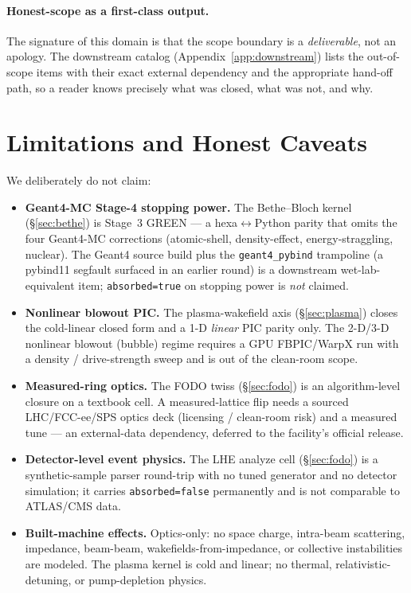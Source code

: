 \documentclass[11pt,a4paper]{article}
\begin{document}
\paragraph{Honest-scope as a first-class output.} The signature of this
domain is that the scope boundary is a \emph{deliverable}, not an
apology. The downstream catalog (Appendix~\ref{app:downstream}) lists the
out-of-scope items with their exact external dependency and the
appropriate hand-off path, so a reader knows precisely what was closed,
what was not, and why.

\section{Limitations and Honest Caveats}
\label{sec:limits}

We deliberately do not claim:
\begin{itemize}\itemsep0.2em
\item \textbf{Geant4-MC Stage-4 stopping power.} The Bethe--Bloch kernel
  (\S\ref{sec:bethe}) is Stage~3 GREEN --- a hexa$\leftrightarrow$Python
  parity that omits the four Geant4-MC corrections (atomic-shell,
  density-effect, energy-straggling, nuclear). The Geant4 source build
  plus the \texttt{geant4\_pybind} trampoline (a pybind11 segfault
  surfaced in an earlier round) is a downstream wet-lab-equivalent item;
  \texttt{absorbed=true} on stopping power is \emph{not} claimed.
\item \textbf{Nonlinear blowout PIC.} The plasma-wakefield axis
  (\S\ref{sec:plasma}) closes the cold-linear closed form and a 1-D
  \emph{linear} PIC parity only. The 2-D/3-D nonlinear blowout (bubble)
  regime requires a GPU FBPIC/WarpX run with a density / drive-strength
  sweep and is out of the clean-room scope.
\item \textbf{Measured-ring optics.} The FODO twiss (\S\ref{sec:fodo}) is
  an algorithm-level closure on a textbook cell. A measured-lattice flip
  needs a sourced LHC/FCC-ee/SPS optics deck (licensing / clean-room
  risk) and a measured tune --- an external-data dependency, deferred to
  the facility's official release.
\item \textbf{Detector-level event physics.} The LHE analyze cell
  (\S\ref{sec:fodo}) is a synthetic-sample parser round-trip with no
  tuned generator and no detector simulation; it carries
  \texttt{absorbed=false} permanently and is not comparable to
  ATLAS/CMS data.
\item \textbf{Built-machine effects.} Optics-only: no space charge,
  intra-beam scattering, impedance, beam-beam, wakefields-from-impedance,
  or collective instabilities are modeled. The plasma kernel is cold and
  linear; no thermal, relativistic-detuning, or pump-depletion physics.
\end{itemize}
\end{document}

